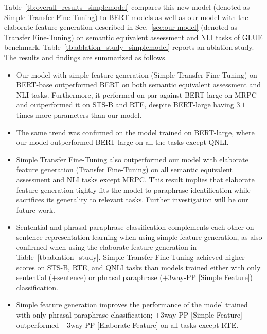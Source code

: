 \documentclass[11pt,a4paper]{article}
\newcommand{\Tref}[1]{Table~\ref{#1}}
\newcommand{\Sref}[1]{Sec.~\ref{#1}}
\begin{document}
\Tref{tb:overall_results_simplemodel} compares this new model (denoted as Simple Transfer Fine-Tuning) to BERT models as well as our model with the elaborate feature generation described in \Sref{sec:our-model} (denoted as Transfer Fine-Tuning) on semantic equivalent assessment and NLI tasks of GLUE benchmark. 
\Tref{tb:ablation_study_simplemodel} reports an ablation study.  
The results and findings are summarized as follows. 
\begin{itemize}
\item Our model with simple feature generation (Simple Transfer Fine-Tuning) on BERT-base outperformed BERT on both semantic equivalent assessment and NLI  tasks. Furthermore, it performed on-par against BERT-large on MRPC and outperformed it on STS-B and RTE, despite BERT-large having $3.1$ times more parameters than our model. 
\item The same trend was confirmed on the model trained on BERT-large, where our model outperformed BERT-large on all the tasks except QNLI. 
\item Simple Transfer Fine-Tuning also outperformed our model with elaborate feature generation (Transfer Fine-Tuning) on all semantic equivalent assessment and NLI tasks except MRPC. This result implies that elaborate feature generation tightly fits the model to paraphrase identification while sacrifices its generality to relevant tasks. Further investigation will be our future work.    
\item Sentential and phrasal paraphrase classification complements each other on sentence representation learning when using simple feature generation, as also confirmed when using the elaborate feature generation in \Tref{tb:ablation_study}. Simple Transfer Fine-Tuning achieved higher scores on STS-B, RTE, and QNLI tasks than models trained either with only sentential ($+$sentence) or phrasal paraphrase ($+3$way-PP [Simple Feature]) classification.
\item Simple feature generation improves the performance of the model trained with only phrasal paraphrase classification; $+3$way-PP [Simple Feature] outperformed $+3$way-PP [Elaborate Feature] on all tasks except RTE.
\end{itemize} 
\end{document}
